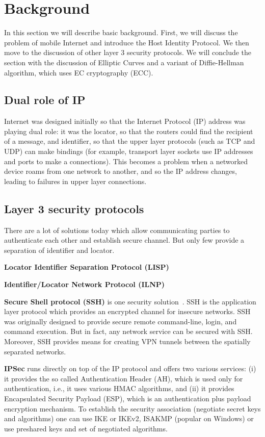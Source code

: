 \section{Background}
\label{section:background}

In this section we will describe basic background. First, we will
discuss the problem of mobile Internet and introduce the Host Identity
Protocol. We then move to the discussion of other layer 3 security protocols.
We will conclude the section with the discussion of Elliptic Curves and
a variant of Diffie-Hellman algorithm, which uses EC cryptography (ECC).

\subsection{Dual role of IP}

Internet was designed initially so that the Internet Protocol (IP)
address was playing dual role: it was the locator, so that the 
routers could find the recipient of a message, and identifier, so that 
the upper layer protocols (such as TCP and UDP) can make bindings 
(for example, transport layer sockets use IP addresses and ports 
to make a connections). This becomes a problem when a networked 
device roams from one network to another, and so the IP address changes, 
leading to failures in upper layer connections. 

\subsection{Layer 3 security protocols}

There are a lot of solutions today which allow communicating parties 
to authenticate each other and establish secure channel. But only few provide
a separation of identifier and locator.

{\bf Locator Identifier Separation Protocol (LISP)}

{\bf Identifier/Locator Network Protocol (ILNP)}

{\bf Secure Shell protocol (SSH)} is one security solution~\cite{ssh}. SSH is
the application layer protocol which provides an encrypted channel for insecure
networks. SSH was originally designed to provide secure  
remote command-line, login, and command execution. But in fact, 
any network service can be secured with SSH. Moreover, SSH provides
means for creating VPN tunnels between the spatially separated networks.

{\bf IPSec} runs directly on top of the IP protocol and offers two 
various services: (i) it provides the so called Authentication Header (AH),
which is used only for authentication, i.e., it uses various HMAC algorithms, and 
(ii) it provides Encapsulated Security Payload (ESP), which is an authentication 
plus payload encryption mechanism. To establish the security association (negotiate
secret keys and algorithms) one can use IKE or IKEv2, ISAKMP (popular on Windows) or
use preshared keys and set of negotiated algorithms.

